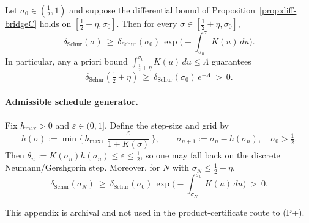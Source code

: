 \begin{theorem}\label{thm:diff-bridgeC}
Let $\sigma_0\in(\tfrac12,1)$ and suppose the differential bound of Proposition~\ref{prop:diff-bridgeC} holds on $[\tfrac12+\eta,\sigma_0]$. Then for every $\sigma\in[\tfrac12+\eta,\sigma_0]$,
\[
  \delta_{\mathrm{Schur}}(\sigma)\ \ge\ \delta_{\mathrm{Schur}}(\sigma_0)\,\exp\!\Big(-\int_{\sigma_0}^{\sigma} K(u)\,du\Big).
\]
In particular, any a priori bound $\int_{\tfrac12+\eta}^{\sigma_0}K(u)\,du\le \Lambda$ guarantees
\[
  \delta_{\mathrm{Schur}}(\tfrac12+\eta)\ \ge\ \delta_{\mathrm{Schur}}(\sigma_0)\,e^{-\Lambda}\ >\ 0.
\]
\end{theorem}

\paragraph{Admissible schedule generator.}
Fix $h_{\max}>0$ and $\varepsilon\in(0,1]$. Define the step-size and grid by
\[
  h(\sigma):=\min\!\Big\{\,h_{\max},\ \frac{\varepsilon}{1+K(\sigma)}\,\Big\},\qquad \sigma_{n+1}:=\sigma_n-h(\sigma_n),\quad \sigma_0>\tfrac12.
\]
Then $\theta_n:=K(\sigma_n)h(\sigma_n)\le \varepsilon\le \tfrac12$, so one may fall back on the discrete Neumann/Gershgorin step. Moreover, for $N$ with $\sigma_N\le \tfrac12+\eta$,
\[
  \delta_{\mathrm{Schur}}(\sigma_N)\ \ge\ \delta_{\mathrm{Schur}}(\sigma_0)\,\exp\!\Big(-\int_{\sigma_N}^{\sigma_0} K(u)\,du\Big)\ >\ 0.
\]

\medskip
\noindent This appendix is archival and not used in the product-certificate route to (P+).
